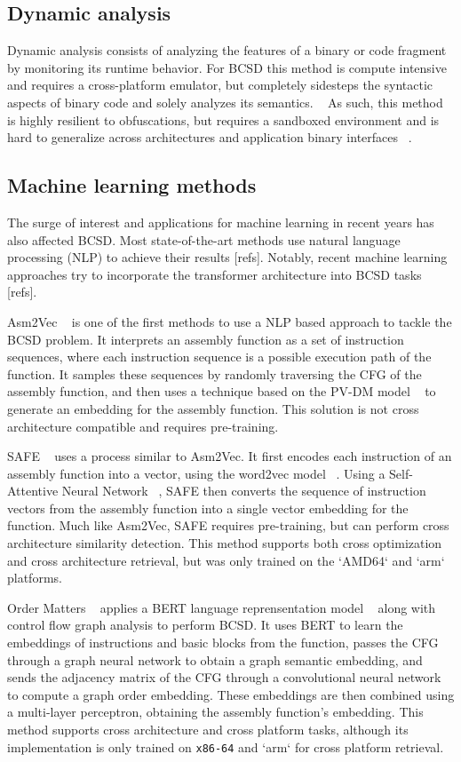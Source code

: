 \documentclass[conference,compsoc]{IEEEtran}
\begin{document}
\subsection{Dynamic analysis}

Dynamic analysis consists of analyzing the features of a binary or code fragment by monitoring its runtime behavior. For BCSD
this method is compute intensive and requires a cross-platform emulator, but completely sidesteps the syntactic aspects of binary code
and solely analyzes its semantics. ~\cite{BCSD} As such, this method is highly resilient to obfuscations, but requires a sandboxed environment
and is hard to generalize across architectures and application binary interfaces ~\cite{blanket-exec}.

\subsection{Machine learning methods}

The surge of interest and applications for machine learning in recent years has also affected BCSD.
Most state-of-the-art methods use natural language processing (NLP) to achieve their results [refs].
Notably, recent machine learning approaches try to incorporate the transformer architecture into BCSD tasks [refs].

Asm2Vec ~\cite{Asm2Vec} is one of the first methods to use a NLP based approach to tackle the BCSD problem. It interprets an
assembly function as a set of instruction sequences, where each instruction sequence is a possible execution path
of the function. It samples these sequences by randomly traversing the CFG of the assembly function, and then
uses a technique based on the PV-DM model ~\cite{PV-DM} to generate an embedding for the assembly function. This solution
is not cross architecture compatible and requires pre-training.

SAFE ~\cite{SAFE} uses a process similar to Asm2Vec. It first encodes each instruction of an assembly function into a vector,
using the word2vec model ~\cite{word2vec}. Using a Self-Attentive Neural Network ~\cite{SANN}, SAFE then converts the sequence of instruction
vectors from the assembly function into a single vector embedding for the function. Much like Asm2Vec, SAFE requires
pre-training, but can perform cross architecture similarity detection. This method supports both cross optimization
and cross architecture retrieval, but was only trained on the `AMD64` and `arm` platforms.

Order Matters ~\cite{OrderMatters} applies a BERT language reprensentation model ~\cite{BERT} along with control flow graph analysis
to perform BCSD. It uses BERT to learn the embeddings of instructions and basic blocks from the function,
passes the CFG through a graph neural network to obtain a graph semantic embedding, and sends the adjacency
matrix of the CFG through a convolutional neural network to compute a graph order embedding. These embeddings
are then combined using a multi-layer perceptron, obtaining the assembly function's embedding. This method
supports cross architecture and cross platform tasks, although its implementation is only trained on \texttt{x86-64}
and `arm` for cross platform retrieval.
\end{document}
